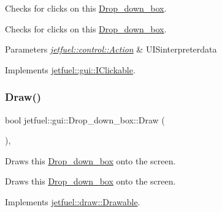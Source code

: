 Checks for clicks on this \hyperlink{classjetfuel_1_1gui_1_1Drop__down__box}{Drop\+\_\+down\+\_\+box}. 

Checks for clicks on this \hyperlink{classjetfuel_1_1gui_1_1Drop__down__box}{Drop\+\_\+down\+\_\+box}.


\begin{DoxyParams}{Parameters}
{\em \hyperlink{structjetfuel_1_1control_1_1Action}{jetfuel\+::control\+::\+Action}} & U\+I\+Sinterpreterdata \\
\hline
\end{DoxyParams}


Implements \hyperlink{classjetfuel_1_1gui_1_1IClickable_aea45de37bd3beb7eb7e2e3056e4e37b3}{jetfuel\+::gui\+::\+I\+Clickable}.

\mbox{\label{classjetfuel_1_1gui_1_1Drop__down__box_a1b62cab3674f45700ad9afd6076a8cb1}} 
\subsubsection{\texorpdfstring{Draw()}{Draw()}}
{\footnotesize\ttfamily bool jetfuel\+::gui\+::\+Drop\+\_\+down\+\_\+box\+::\+Draw (\begin{DoxyParamCaption}{ }\end{DoxyParamCaption})\hspace{0.3cm}{\ttfamily [override]}, {\ttfamily [virtual]}}



Draws this \hyperlink{classjetfuel_1_1gui_1_1Drop__down__box}{Drop\+\_\+down\+\_\+box} onto the screen. 

Draws this \hyperlink{classjetfuel_1_1gui_1_1Drop__down__box}{Drop\+\_\+down\+\_\+box} onto the screen. 

Implements \hyperlink{classjetfuel_1_1draw_1_1Drawable_a1a072070322965ce9411ee6e7c311c56}{jetfuel\+::draw\+::\+Drawable}.

\mbox{\label{classjetfuel_1_1gui_1_1Drop__down__box_ae29b89b98fa3211ead2fffc712ce264f}} 
